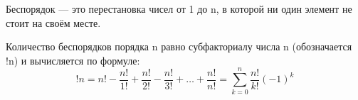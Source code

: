 \begin{definition}
  Беспорядок — это перестановка чисел от 1 до n,
  в которой ни один элемент не стоит на своём месте.
\end{definition}

\begin{theorem}
  Количество беспорядков порядка n равно субфакториалу числа n
 (обозначается !n) и вычисляется по формуле:
 $$!n  = n! - \frac{n!}{1!} + \frac{n!}{2!} - \frac{n!}{3!} + \dots + \frac{n!}{n!} = \sum_{k=0}^{n}\frac{n!}{k!}(-1)^{k}$$
\end{theorem}